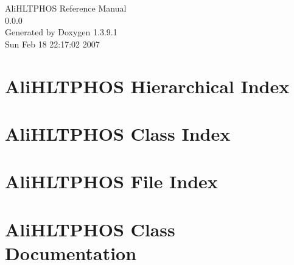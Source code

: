 \documentclass[a4paper]{book}
\begin{document}
\begin{titlepage}
\vspace*{7cm}
\begin{center}
{\Large Ali\-HLTPHOS Reference Manual\\[1ex]\large 0.0.0 }\\
\vspace*{1cm}
{\large Generated by Doxygen 1.3.9.1}\\
\vspace*{0.5cm}
{\small Sun Feb 18 22:17:02 2007}\\
\end{center}
\end{titlepage}
\clearemptydoublepage
{}
\tableofcontents
\clearemptydoublepage
{}
\chapter{Ali\-HLTPHOS Hierarchical Index}

\chapter{Ali\-HLTPHOS Class Index}

\chapter{Ali\-HLTPHOS File Index}

\chapter{Ali\-HLTPHOS Class Documentation}





















\end{document}
